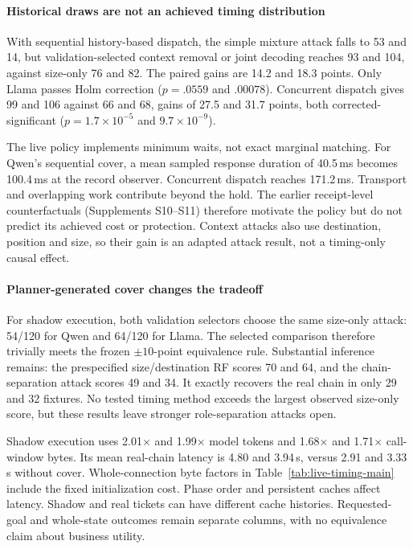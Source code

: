 \paragraph{Historical draws are not an achieved timing distribution}
With sequential history-based dispatch, the simple mixture attack falls to 53 and 14, but validation-selected context removal or joint decoding reaches 93 and 104, against size-only 76 and 82. The paired gains are 14.2 and 18.3 points. Only Llama passes Holm correction ($p=.0559$ and $.00078$). Concurrent dispatch gives 99 and 106 against 66 and 68, gains of 27.5 and 31.7 points, both corrected-significant ($p=1.7\times10^{-5}$ and $9.7\times10^{-9}$).

The live policy implements minimum waits, not exact marginal matching. For Qwen's sequential cover, a mean sampled response duration of 40.5\,ms becomes 100.4\,ms at the record observer. Concurrent dispatch reaches 171.2\,ms. Transport and overlapping work contribute beyond the hold. The earlier receipt-level counterfactuals (Supplements S10--S11) therefore motivate the policy but do not predict its achieved cost or protection. Context attacks also use destination, position and size, so their gain is an adapted attack result, not a timing-only causal effect.

\paragraph{Planner-generated cover changes the tradeoff}
For shadow execution, both validation selectors choose the same size-only attack: 54/120 for Qwen and 64/120 for Llama. The selected comparison therefore trivially meets the frozen $\pm10$-point equivalence rule. Substantial inference remains: the prespecified size/destination RF scores 70 and 64, and the chain-separation attack scores 49 and 34. It exactly recovers the real chain in only 29 and 32 fixtures. No tested timing method exceeds the largest observed size-only score, but these results leave stronger role-separation attacks open.

Shadow execution uses 2.01$\times$ and 1.99$\times$ model tokens and 1.68$\times$ and 1.71$\times$ call-window bytes. Its mean real-chain latency is 4.80 and 3.94\,s, versus 2.91 and 3.33\,s without cover. Whole-connection byte factors in Table~\ref{tab:live-timing-main} include the fixed initialization cost. Phase order and persistent caches affect latency. Shadow and real tickets can have different cache histories. Requested-goal and whole-state outcomes remain separate columns, with no equivalence claim about business utility.

